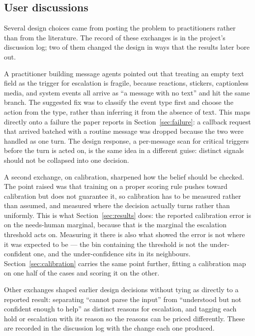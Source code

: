 \documentclass{article}
\begin{document}
\subsection{User discussions}
Several design choices came from posting the problem to practitioners rather than
from the literature. The record of these exchanges is in the project's
discussion log; two of them changed the design in ways that the results later
bore out.

A practitioner building message agents pointed out that treating an empty text
field as the trigger for escalation is fragile, because reactions, stickers,
captionless media, and system events all arrive as ``a message with no text'' and
hit the same branch. The suggested fix was to classify the event type first and
choose the action from the type, rather than inferring it from the absence of
text. This maps directly onto a failure the paper reports in
Section~\ref{sec:failure}: a callback request that arrived batched with a routine
message was dropped because the two were handled as one turn. The design response,
a per-message scan for critical triggers before the turn is acted on, is the same
idea in a different guise: distinct signals should not be collapsed into one
decision.

A second exchange, on calibration, sharpened how the belief should be checked. The
point raised was that training on a proper scoring rule pushes toward calibration
but does not guarantee it, so calibration has to be measured rather than assumed,
and measured where the decision actually turns rather than uniformly. This is
what Section~\ref{sec:results} does: the reported calibration error is on the
needs-human marginal, because that is the marginal the escalation threshold acts
on. Measuring it there is also what showed the error is not where it was expected
to be --- the bin containing the threshold is not the under-confident one, and the
under-confidence sits in its neighbours. Section~\ref{sec:calibration} carries the
same point further, fitting a calibration map on one half of the cases and scoring
it on the other.

Other exchanges shaped earlier design decisions without tying as directly to a
reported result: separating ``cannot parse the input'' from ``understood but not
confident enough to help'' as distinct reasons for escalation, and tagging each
hold or escalation with its reason so the reasons can be priced differently.
These are recorded in the discussion log with the change each one produced.
\end{document}
